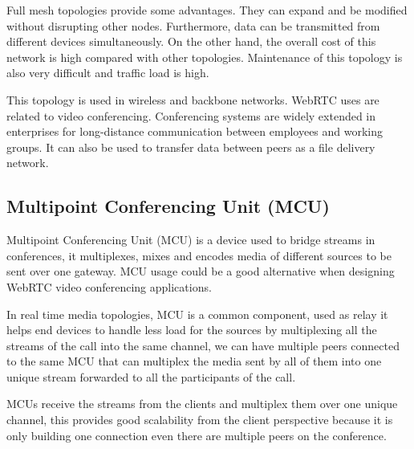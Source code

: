 Full mesh topologies provide some advantages. They can expand and be modified without disrupting other nodes. Furthermore, data can be transmitted from different devices simultaneously. On the other hand, the overall cost of this network is high compared with other topologies. Maintenance of this topology is also very difficult and traffic load is high.

This topology is used in wireless and backbone networks. WebRTC uses are related to video conferencing. Conferencing systems are widely extended in enterprises for long-distance communication between employees and working groups. It can also be used to transfer data between peers as a file delivery network. 

%	
%		
%

\subsection{Multipoint Conferencing Unit (MCU)}

Multipoint Conferencing Unit (MCU)  is a device used to bridge streams in conferences, it multiplexes, mixes and encodes media of different sources to be sent over one gateway. MCU usage could be a good alternative when designing WebRTC video conferencing applications. %

In real time media topologies, MCU is a common component, used as relay it helps end devices to handle less load for the sources by multiplexing all the streams of the call into the same channel, we can have multiple peers connected to the same MCU that can multiplex the media sent by all of them into one unique stream forwarded to all the participants of the call.

MCUs receive the streams from the clients and multiplex them over one unique channel, this provides good scalability from the client perspective because it is only building one connection even there are multiple peers on the conference.

